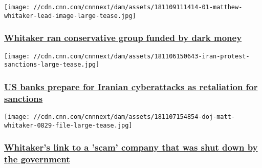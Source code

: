 \href{/2018/11/09/politics/matthew-whitaker-dark-money/index.html}{}

\texttt{[image: //cdn.cnn.com/cnnnext/dam/assets/181109111414-01-matthew-whitaker-lead-image-large-tease.jpg]}

\hypertarget{whitaker-ran-conservative-group-funded-by-dark-money}{%
\subsubsection{\texorpdfstring{\href{/2018/11/09/politics/matthew-whitaker-dark-money/index.html}{Whitaker
ran conservative group funded by dark
money}}{Whitaker ran conservative group funded by dark money}}\label{whitaker-ran-conservative-group-funded-by-dark-money}}

\href{/2018/11/09/tech/iran-sanctions-us-banks-cyber-hack-invs/index.html}{}

\texttt{[image: //cdn.cnn.com/cnnnext/dam/assets/181106150643-iran-protest-sanctions-large-tease.jpg]}

\hypertarget{us-banks-prepare-for-iranian-cyberattacks-as-retaliation-for-sanctions}{%
\subsubsection{\texorpdfstring{\href{/2018/11/09/tech/iran-sanctions-us-banks-cyber-hack-invs/index.html}{US
banks prepare for Iranian cyberattacks as retaliation for
sanctions}}{US banks prepare for Iranian cyberattacks as retaliation for sanctions}}\label{us-banks-prepare-for-iranian-cyberattacks-as-retaliation-for-sanctions}}

\href{/2018/11/07/politics/whitaker-company-government/index.html}{}

\texttt{[image: //cdn.cnn.com/cnnnext/dam/assets/181107154854-doj-matt-whitaker-0829-file-large-tease.jpg]}

\hypertarget{whitakers-link-to-a-scam-company-that-was-shut-down-by-the-government}{%
\subsubsection{\texorpdfstring{\href{/2018/11/07/politics/whitaker-company-government/index.html}{Whitaker's
link to a 'scam' company that was shut down by the
government}}{Whitaker's link to a 'scam' company that was shut down by the government}}\label{whitakers-link-to-a-scam-company-that-was-shut-down-by-the-government}}

\href{/2018/11/02/us/officials-dismiss-shooting-rock-throwing-migrants-trump-invs/index.html}{}

